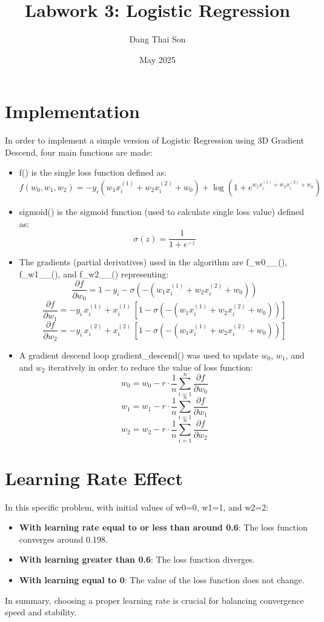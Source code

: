 \documentclass{article}
\title{Labwork 3: Logistic Regression}
\author{Dang Thai Son}
\date{May 2025}
\begin{document}
\maketitle

\section{Implementation}
In order to implement a simple version of Logistic Regression using 3D Gradient Descend, four main functions are made: 

\begin{itemize}
    \item f() is the single loss function defined as:
    \[
    f(w_0, w_1, w_2) = -y_i \left(w_1 x_i^{(1)} + w_2 x_i^{(2)} + w_0\right) + \log \left(1 + e^{w_1 x_i^{(1)} + w_2 x_i^{(2)} + w_0}\right)
    \]
    \item sigmoid() is the sigmoid function (used to calculate single loss value) defined as:
    \[
    \sigma(z) = \frac{1}{1 + e^{-z}}
    \]
    \item The gradients (partial derivatives) used in the algorithm are f\_w0\_\_(), f\_w1\_\_(), and f\_w2\_\_() representing:
    \[
    \frac{\partial f}{\partial w_0} = 1 - y_i - \sigma\left(-\left(w_1 x_i^{(1)} + w_2 x_i^{(2)} + w_0\right)\right)
    \]
    \[
    \frac{\partial f}{\partial w_1} = -y_i \, x_i^{(1)} + x_i^{(1)} \, \left[1 - \sigma\left(-\left(w_1 x_i^{(1)} + w_2 x_i^{(2)} + w_0\right)\right)\right]
    \]
    \[
    \frac{\partial f}{\partial w_2} = -y_i \, x_i^{(2)} + x_i^{(2)} \, \left[1 - \sigma\left(-\left(w_1 x_i^{(1)} + w_2 x_i^{(2)} + w_0\right)\right)\right]
    \]
    \item A gradient descend loop gradient\_descend() was used to update $w_0$, $w_1$, and and $w_2$ iteratively in order to reduce the value of loss function:
    \[
    w_0 = w_0 - r \cdot \frac{1}{n} \sum_{i=1}^{n} \frac{\partial f}{\partial w_0}
    \]
    \[
    w_1 = w_1 - r \cdot \frac{1}{n} \sum_{i=1}^{n} \frac{\partial f}{\partial w_1}
    \]
    \[
    w_2 = w_2 - r \cdot \frac{1}{n} \sum_{i=1}^{n} \frac{\partial f}{\partial w_2}
    \]
\end{itemize}

\section{Learning Rate Effect}
In this specific problem, with initial values of w0=0, w1=1, and w2=2:

\begin{itemize}
    \item \textbf{With learning rate equal to or less than around 0.6}: The loss function converges around 0.198.
    \item \textbf{With learning greater than 0.6}: The loss function diverges.
    \item \textbf{With learning equal to 0}: The value of the loss function does not change.
\end{itemize}

In summary, choosing a proper learning rate is crucial for balancing convergence speed and stability.
\end{document}
